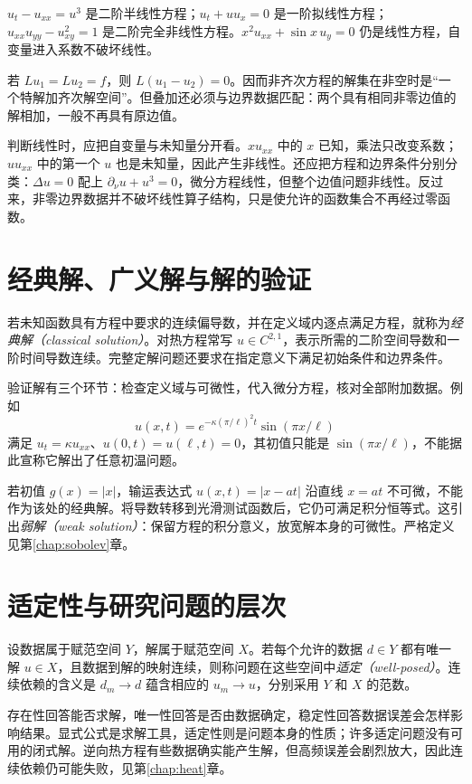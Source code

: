 \begin{example}
$u_t-u_{xx}=u^3$ 是二阶半线性方程；$u_t+u u_x=0$ 是一阶拟线性方程；$u_{xx}u_{yy}-u_{xy}^2=1$ 是二阶完全非线性方程。$x^2u_{xx}+\sin x\,u_y=0$ 仍是线性方程，自变量进入系数不破坏线性。
\end{example}
若 $Lu_1=Lu_2=f$，则 $L(u_1-u_2)=0$。因而非齐次方程的解集在非空时是“一个特解加齐次解空间”。但叠加还必须与边界数据匹配：两个具有相同非零边值的解相加，一般不再具有原边值。

判断线性时，应把自变量与未知量分开看。$x u_{xx}$ 中的 $x$ 已知，乘法只改变系数；$u u_{xx}$ 中的第一个 $u$ 也是未知量，因此产生非线性。还应把方程和边界条件分别分类：$\Delta u=0$ 配上 $\partial_\nu u+u^3=0$，微分方程线性，但整个边值问题非线性。反过来，非零边界数据并不破坏线性算子结构，只是使允许的函数集合不再经过零函数。

\section{经典解、广义解与解的验证}
\begin{definition}
若未知函数具有方程中要求的连续偏导数，并在定义域内逐点满足方程，就称为\emph{经典解（classical solution）}。对热方程常写 $u\in C^{2,1}$，表示所需的二阶空间导数和一阶时间导数连续。完整定解问题还要求在指定意义下满足初始条件和边界条件。
\end{definition}
验证解有三个环节：检查定义域与可微性，代入微分方程，核对全部附加数据。例如
\[
 u(x,t)=e^{-\kappa(\pi/\ell)^2t}\sin(\pi x/\ell)
\]
满足 $u_t=\kappa u_{xx}$、$u(0,t)=u(\ell,t)=0$，其初值只能是 $\sin(\pi x/\ell)$，不能据此宣称它解出了任意初温问题。

若初值 $g(x)=|x|$，输运表达式 $u(x,t)=|x-at|$ 沿直线 $x=at$ 不可微，不能作为该处的经典解。将导数转移到光滑测试函数后，它仍可满足积分恒等式。这引出\emph{弱解（weak solution）}：保留方程的积分意义，放宽解本身的可微性。严格定义见第\ref{chap:sobolev}章。

\section{适定性与研究问题的层次}
\begin{definition}
设数据属于赋范空间 $Y$，解属于赋范空间 $X$。若每个允许的数据 $d\in Y$ 都有唯一解 $u\in X$，且数据到解的映射连续，则称问题在这些空间中\emph{适定（well-posed）}。连续依赖的含义是 $d_m\to d$ 蕴含相应的 $u_m\to u$，分别采用 $Y$ 和 $X$ 的范数。
\end{definition}
存在性回答能否求解，唯一性回答是否由数据确定，稳定性回答数据误差会怎样影响结果。显式公式是求解工具，适定性则是问题本身的性质；许多适定问题没有可用的闭式解。逆向热方程有些数据确实能产生解，但高频误差会剧烈放大，因此连续依赖仍可能失败，见第\ref{chap:heat}章。

